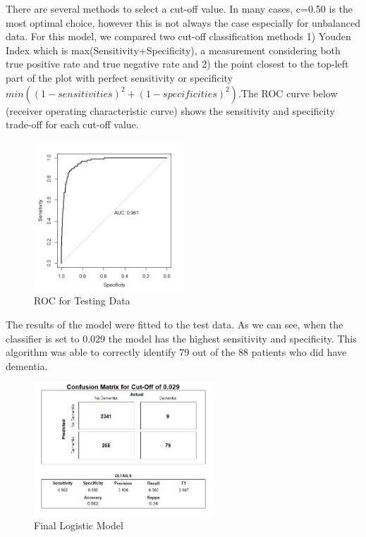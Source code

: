 \documentclass[a4paper,man,natbib,11pt]{article}
\begin{document}
There are several methods to select a cut-off value. In many cases, c=0.50 is the most optimal choice, however this is not always the case especially for unbalanced data. For this model, we compared two cut-off classification methods 1) Youden Index which is max(Sensitivity+Specificity), a measurement considering both true positive rate and true negative rate and 2) the point closest to the top-left part of the plot with perfect sensitivity or specificity $min((1-sensitivities)^{2}+(1-specificities)^{2})$.The ROC curve below (receiver operating characteristic curve) shows the sensitivity and specificity trade-off for each cut-off value. 

\begin{figure}[h!]
\centering
  \includegraphics[width=0.5\textwidth]{roc_logistic.png}
  \caption{ROC for Testing Data}
\end{figure}

The results of the model were fitted to the test data. As we can see, when the classifier is set to 0.029 the model has the highest sensitivity and specificity. This algorithm was able to correctly identify 79 out of the 88 patients who did have dementia.  

\begin{figure}[h!]
\centering
  \includegraphics[width=0.6\textwidth]{figures/cm_0.029.png}
  \caption{Final Logistic Model}
\end{figure}
\end{document}
